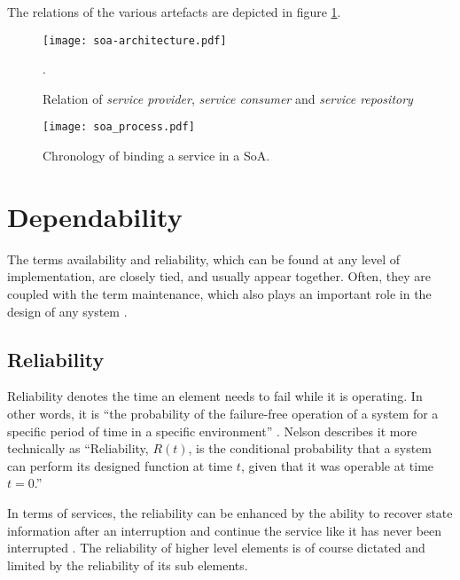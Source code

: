 The relations of the various artefacts are depicted in figure \ref{fig:soa_overview}.

\begin{figure}[!htbp]
\centering
\texttt{[image: soa-architecture.pdf]}
\caption{Relation of \emph{service provider}, \emph{service consumer} and \emph{service repository} \cite{arrowhead}}.
\label{fig:soa_overview}
\end{figure}

\begin{figure}[!htbp]
\centering
\texttt{[image: soa\_process.pdf]}
\caption{Chronology of binding a service in a SoA.}
\label{fig:service_cronology}
\end{figure}









\section{Dependability}

The terms availability and reliability, which can be found at any level of implementation, are closely tied, and usually appear together. Often, they are coupled with the term maintenance, which also plays an important role in the design of any system \cite[p.116]{genesys} \cite{lessner}.

\subsection{Reliability}
\label{sec:reliability}

Reliability denotes the time an element needs to fail while it is operating. In other words, it is ``the probability of the failure-free operation of a system for a specific period of time in a specific environment'' \cite[p.116]{genesys}. Nelson \cite{nelson} describes it more technically as ``Reliability, $R(t)$, is the conditional probability that a system can perform its designed function at time $t$, given that it was operable at time $t=0$.''

In terms of services, the reliability can be enhanced by the ability to recover state information after an interruption and continue the service like it has never been interrupted \cite{genesys}. The reliability of higher level elements is of course dictated and limited by the reliability of its sub elements.


